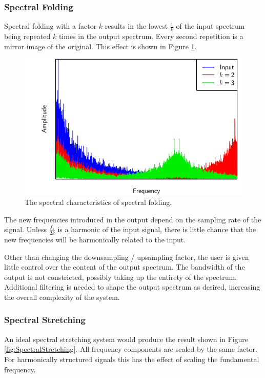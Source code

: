 		\subsubsection*{Spectral Folding}
			Spectral folding with a factor $k$ results in the lowest $\frac{1}{k}$ of the input spectrum being
			repeated $k$ times in the output spectrum. Every second repetition is a mirror image of the
			original. This effect is shown in Figure \ref{fig:SpectralFolding}. 
			
			\begin{figure}[h!]
				\centering
				\includegraphics{chapter5/Images/SpectralFoldingSpectrum.pdf}
				\caption{The spectral characteristics of spectral folding.}
				\label{fig:SpectralFolding}
			\end{figure}

			The new frequencies introduced in the output depend on the sampling rate of the signal. Unless
			$\frac{f_{s}}{2k}$ is a harmonic of the input signal, there is little chance that the new
			frequencies will be harmonically related to the input.

			Other than changing the downsampling / upsampling factor, the user is given little control over the
			content of the output spectrum. The bandwidth of the output is not constricted, possibly taking up
			the entirety of the spectrum. Additional filtering is needed to shape the output spectrum as
			desired, increasing the overall complexity of the system.

		\subsubsection*{Spectral Stretching}
			An ideal spectral stretching system would produce the result shown in Figure
			\ref{fig:SpectralStretching}. All frequency components are scaled by the same factor. For
			harmonically structured signals this has the effect of scaling the fundamental frequency.

